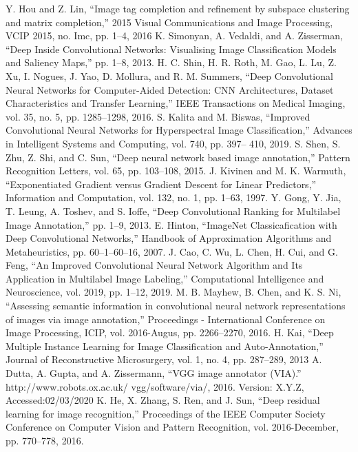 \documentclass[conference]{IEEEtran}
\begin{document}
\begin{thebibliography}{00}
	 Y. Hou and Z. Lin, “Image tag completion and refinement by subspace clustering and
 matrix completion,” 2015 Visual Communications and Image Processing, VCIP 2015,
no. Imc, pp. 1–4, 2016
	 K. Simonyan, A. Vedaldi, and A. Zisserman, “Deep Inside Convolutional Networks: Visualising Image Classification Models and Saliency Maps,” pp. 1–8, 2013.
	 H. C. Shin, H. R. Roth, M. Gao, L. Lu, Z. Xu, I. Nogues, J. Yao, D. Mollura, and R. M. Summers, “Deep Convolutional Neural Networks for Computer-Aided Detection: CNN Architectures, Dataset Characteristics and Transfer Learning,” IEEE Transactions on Medical Imaging, vol. 35, no. 5, pp. 1285–1298, 2016.
	 S. Kalita and M. Biswas, “Improved Convolutional Neural Networks for Hyperspectral Image Classification,” Advances in Intelligent Systems and Computing, vol. 740, pp. 397– 410, 2019.
	 S. Shen, S. Zhu, Z. Shi, and C. Sun, “Deep neural network based image annotation,” Pattern Recognition Letters, vol. 65, pp. 103–108, 2015.
	 J. Kivinen and M. K. Warmuth, “Exponentiated Gradient versus Gradient Descent for	Linear Predictors,” Information and Computation, vol. 132, no. 1, pp. 1–63, 1997.
	 Y. Gong, Y. Jia, T. Leung, A. Toshev, and S. Ioffe, “Deep Convolutional Ranking for
Multilabel Image Annotation,” pp. 1–9, 2013.
	 E. Hinton, “ImageNet Classicafication with Deep Convolutional Networks,” Handbook of Approximation Algorithms and Metaheuristics, pp. 60–1–60–16, 2007.
	 J. Cao, C. Wu, L. Chen, H. Cui, and G. Feng, “An Improved Convolutional Neural
Network Algorithm and Its Application in Multilabel Image Labeling,” Computational
Intelligence and Neuroscience, vol. 2019, pp. 1–12, 2019.
	 M. B. Mayhew, B. Chen, and K. S. Ni, “Assessing semantic information in convolutional neural network representations of images via image annotation,” Proceedings -
International Conference on Image Processing, ICIP, vol. 2016-Augus, pp. 2266–2270,
2016.
	 H. Kai, “Deep Multiple Instance Learning for Image Classification and
 Auto-Annotation,” Journal of Reconstructive Microsurgery, vol. 1, no. 4, pp. 287–289,
2013
	 A. Dutta, A. Gupta, and A. Zissermann, “VGG image annotator (VIA).”
 http://www.robots.ox.ac.uk/ vgg/software/via/, 2016. Version: X.Y.Z, Accessed:02/03/2020
	 K. He, X. Zhang, S. Ren, and J. Sun, “Deep residual learning for image recognition,”
Proceedings of the IEEE Computer Society Conference on Computer Vision and Pattern
Recognition, vol. 2016-December, pp. 770–778, 2016.
 
\end{thebibliography}
\vspace{12pt}
\end{document}
